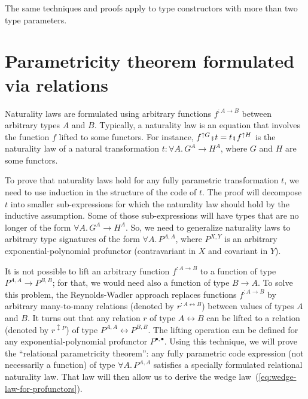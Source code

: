 The same techniques and proofs apply to type constructors with more
than two type parameters.

\section{Parametricity theorem formulated via relations\label{sec:Parametricity-theorem-for-relations}\label{subsec:Relations-between-types}}

Naturality laws are formulated using arbitrary functions $f^{:A\rightarrow B}$
between arbitrary types $A$ and $B$. Typically, a naturality law
is an equation that involves the function $f$ lifted to some functors.
For instance, $f^{\uparrow G}\bef t=t\bef f^{\uparrow H}$ is the
naturality law of a natural transformation $t:\forall A.\,G^{A}\rightarrow H^{A}$,
where $G$ and $H$ are some functors.

To prove that naturality laws hold for any fully parametric transformation
$t$, we need to use induction in the structure of the code of $t$.
The proof will decompose $t$ into smaller sub-expressions for which
the naturality law should hold by the inductive assumption. Some of
those sub-expressions will have types that are no longer of the form
$\forall A.\,G^{A}\rightarrow H^{A}$. So, we need to generalize naturality
laws to arbitrary type signatures of the form $\forall A.\,P^{A,A}$,
where $P^{X,Y}$ is an arbitrary exponential-polynomial profunctor
(contravariant in $X$ and covariant in $Y$). 

It is not possible to lift an arbitrary function $f^{:A\rightarrow B}$
to a function of type $P^{A,A}\rightarrow P^{B,B}$; for that, we
would need also a function of type $B\rightarrow A$. To solve this
problem, the Reynolds-Wadler approach replaces functions $f^{:A\rightarrow B}$
by arbitrary many-to-many relations (denoted by $r^{:A\leftrightarrow B}$)
between values of types $A$ and $B$. It turns out that any relation
$r$ of type $A\leftrightarrow B$ can be lifted to a relation (denoted
by $r^{\updownarrow P}$) of type $P^{A,A}\leftrightarrow P^{B,B}$.
The lifting operation can be defined for any exponential-polynomial
profunctor $P^{\bullet,\bullet}$. Using this technique, we will prove
the \textsf{``}relational parametricity theorem\textsf{''}: any fully parametric code
expression (not necessarily a function) of type $\forall A.\,P^{A,A}$
satisfies a specially formulated relational naturality law. That law
will then allow us to derive the wedge law~(\ref{eq:wedge-law-for-profunctors}).


